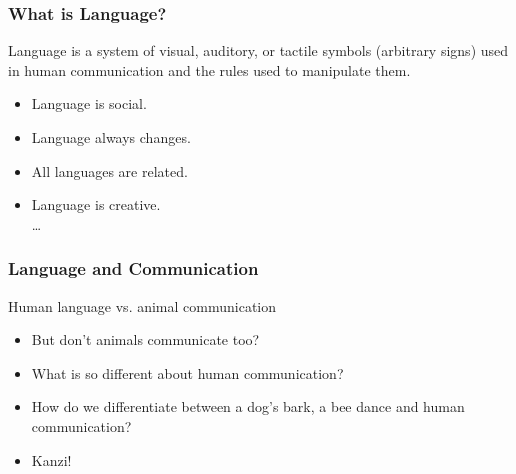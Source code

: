 \documentclass[12pt, table]{beamer}
\begin{document}
\begin{frame}
\frametitle{What is Language?}
Language is a system of visual, auditory, or tactile symbols (arbitrary signs) used in human communication and the rules used to manipulate them.\\
\begin{itemize} 
\item Language is social.
\item Language always changes.
\item All languages are related. 
\item Language is creative.\\
\dots
\end{itemize}
\end{frame}

\begin{frame}
\frametitle{Language and Communication}
Human language vs. animal communication\\
\begin{itemize}
\item But don't animals communicate too?
\item What is so different about human communication? 
\item How do we differentiate between a dog's bark, a bee dance and human communication?
\item Kanzi! 
\end{itemize}
\end{frame}

\begin{frame}
\end{frame}
\end{document}
